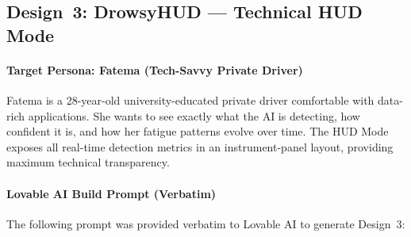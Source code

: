 \documentclass[sigconf]{acmart}
\begin{document}
\subsection{Design~3: DrowsyHUD --- Technical HUD Mode}

\paragraph{Target Persona: Fatema (Tech-Savvy Private Driver)}
Fatema is a 28-year-old university-educated private driver comfortable with data-rich applications. She wants to see exactly what the AI is detecting, how confident it is, and how her fatigue patterns evolve over time. The HUD Mode exposes all real-time detection metrics in an instrument-panel layout, providing maximum technical transparency.

\paragraph{Lovable AI Build Prompt (Verbatim)}
The following prompt was provided verbatim to Lovable AI to generate Design~3:
\end{document}
